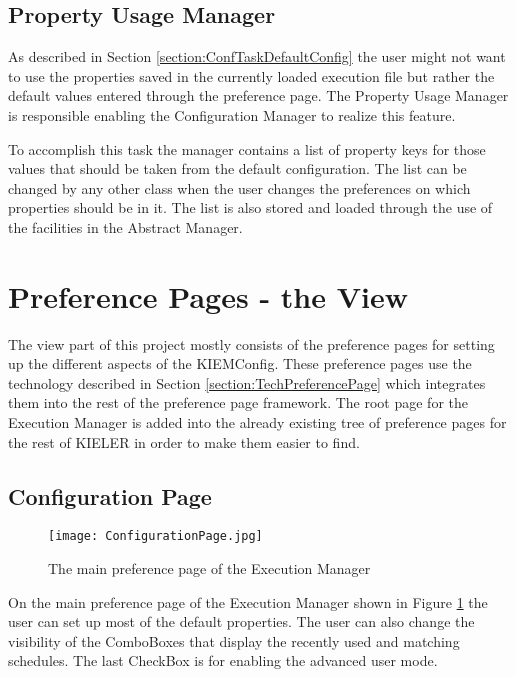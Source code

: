 \subsection{Property Usage Manager}
\label{section:Property Usage Manager}
As described in Section \ref{section:ConfTaskDefaultConfig} the user might not want to use
the properties saved in the currently loaded execution file but rather the default values
entered through the preference page. The Property Usage Manager is responsible enabling
the Configuration Manager to realize this feature.

To accomplish this task the manager contains a list of property keys for those values
that should be taken from the default configuration. The list can be changed by any other
class when the user changes the preferences on which properties should be in it. The list
is also stored and loaded through the use of the facilities in the Abstract Manager.


\section{Preference Pages - the View}
\label{section:ConfView}
The view part of this project mostly consists of the preference pages for setting up the different
aspects of the \ac{KIEMConfig}. These preference pages use the technology described in Section
\ref{section:TechPreferencePage} which integrates them into the rest of the preference page
framework. The root page for the Execution Manager is added into the already existing tree
of preference pages for the rest of \ac{KIELER} in order to make them easier to find.

\subsection{Configuration Page}
\label{section:ConfigurationPage}
\begin{figure}[Configuration Page]
  \centering
  \texttt{[image: ConfigurationPage.jpg]}
  \caption[The main preference page of the Execution Manager]%
  {The main preference page of the Execution Manager\protect}
  \label{fig:ConfigurationPage}
\end{figure}
On the main preference page of the Execution Manager shown in Figure \ref{fig:ConfigurationPage} the user can
set up most of the default properties. The user can also change the visibility of the ComboBoxes that display
the recently used and matching schedules. The last CheckBox is for enabling the advanced user mode.

